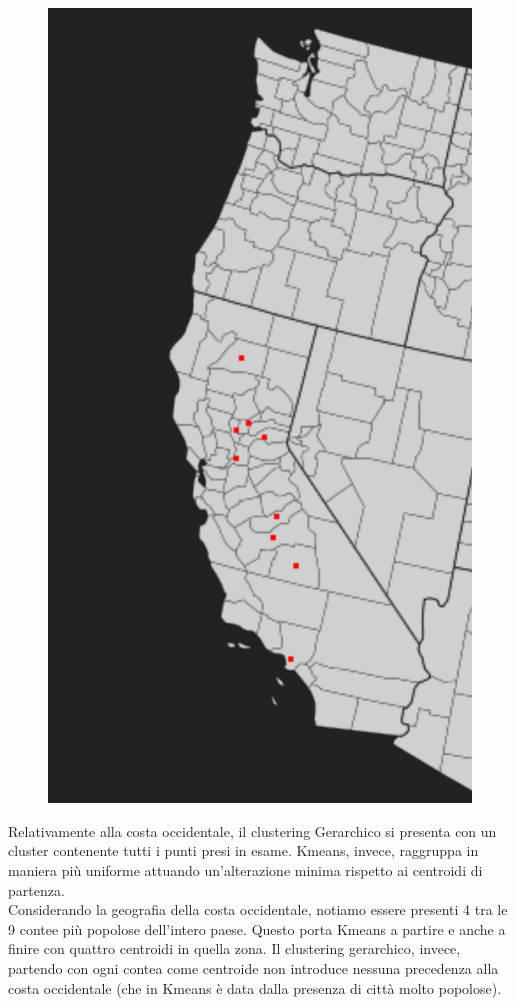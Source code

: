 \documentclass{article}
\begin{document}
\begin{figure}
	\vspace*{-0.5cm}
	\centering
	\includegraphics[width=1.0\linewidth]{figures/costa}
	
\end{figure}
Relativamente alla costa occidentale, il clustering Gerarchico si presenta con un cluster contenente tutti i punti presi in esame. Kmeans, invece, raggruppa in maniera più uniforme attuando un'alterazione minima rispetto ai centroidi di partenza.\\
Considerando la geografia della costa occidentale, notiamo essere presenti 4 tra le 9 contee più popolose dell'intero paese.
Questo porta Kmeans a partire e anche a finire con quattro centroidi in quella zona.
Il clustering gerarchico, invece, partendo con ogni contea come centroide non introduce nessuna precedenza alla costa occidentale (che in Kmeans è data dalla presenza di città molto popolose).\\
\end{document}
